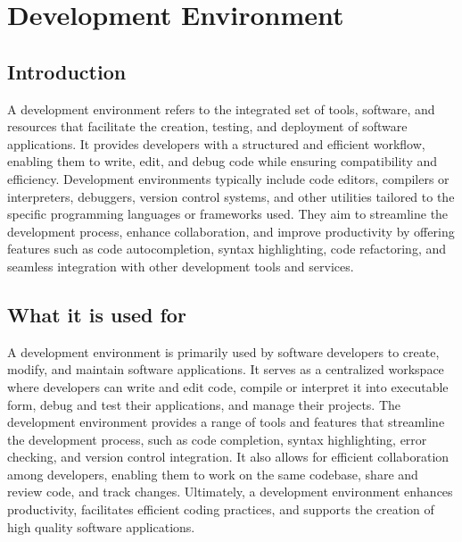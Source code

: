 %
%


\chapter{Development Environment}
\label{chapter:devEnv}

\section{Introduction}

A development environment refers to the integrated set of tools, software, and resources that facilitate the creation, testing, and deployment of software applications. It provides developers with a structured and efficient workflow, enabling them to write, edit, and debug code while ensuring compatibility and efficiency. Development environments typically include code editors, compilers or interpreters, debuggers, version control systems, and other utilities tailored to the specific programming languages or frameworks used. They aim to streamline the development process, enhance collaboration, and improve productivity by offering features such as code autocompletion, syntax highlighting, code refactoring, and seamless integration with other development tools and services.

\section{What it is used for}

A development environment is primarily used by software developers to create, modify, and maintain software applications. It serves as a centralized workspace where developers can write and edit code, compile or interpret it into executable form, debug and test their applications, and manage their projects. The development environment provides a range of tools and features that streamline the development process, such as code completion, syntax highlighting, error checking, and version control integration. It also allows for efficient collaboration among developers, enabling them to work on the same codebase, share and review code, and track changes. Ultimately, a development environment enhances productivity, facilitates efficient coding practices, and supports the creation of high quality software applications.

